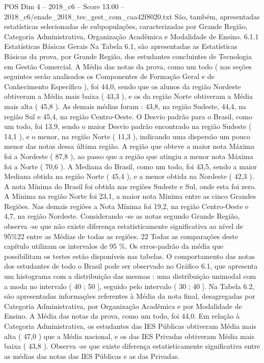 \begin{textsample}{POS Dim 4 – 2018\_c6 – Score 13.00 – 2018\_c6/enade\_2018\_tec\_gest\_com\_caa42f8020.txt}
São, também, apresentadas estatísticas selecionadas de subpopulações, caracterizadas por Grande Região, Categoria Administrativa, Organização Acadêmica e Modalidade de Ensino. 6.1.1 Estatísticas Básicas Gerais Na Tabela 6.1, são apresentadas as Estatísticas Básicas da prova, por Grande Região, dos estudantes concluintes de Tecnologia em Gestão Comercial.
A Média das notas da prova, como um todo ( nas seções seguintes serão analisados os Componentes de Formação Geral e de Conhecimento Específico ), foi 44,0, sendo que os alunos da região Nordeste obtiveram a Média mais baixa ( 43,3 ), e os da região Norte obtiveram a Média mais alta ( 45,8 ).
As demais médias foram : 43,8, na região Sudeste, 44,4, na região Sul e 45,4, na região Centro-Oeste.
O Desvio padrão para o Brasil, como um todo, foi 13,9, sendo o maior Desvio padrão encontrado na região Sudeste ( 14,1 ), e o menor, na região Norte ( 11,3 ), indicando uma dispersão um pouco menor das notas dessa última região.
A região que obteve a maior nota Máxima foi a Nordeste ( 87,8 ), ao passo que a região que atingiu a menor nota Máxima foi a Norte ( 70,6 ).
A Mediana do Brasil, como um todo, foi 43,5, sendo a maior Mediana obtida na região Norte ( 45,4 ), e a menor obtida na Nordeste ( 42,3 ).
A nota Mínima do Brasil foi obtida nas regiões Sudeste e Sul, onde esta foi zero.
A Mínima na região Norte foi 23,1, a maior nota Mínima entre as cinco Grandes Regiões.
Nas demais regiões a Nota Mínima foi 19,2, na região Centro-Oeste e 4,7, na região Nordeste.
Considerando -se as notas segundo Grande Região, observa -se que não existe diferença estatisticamente significativa ao nível de 95\%22 entre as Médias de todas as regiões. 22 Todas as comparações deste capítulo utilizam os intervalos de 95 \%.
Os erros-padrão da média que possibilitam os testes estão disponíveis nas tabelas.
O comportamento das notas dos estudantes de todo o Brasil pode ser observado no Gráfico 6.1, que apresenta um histograma com a distribuição das mesmas : uma distribuição unimodal com a moda no intervalo ( 40 ; 50 ], seguido pelo intervalo ( 30 ; 40 ].
Na Tabela 6.2, são apresentadas informações referentes à Média da nota final, desagregadas por Categoria Administrativa, por Organização Acadêmica e por Modalidade de Ensino.
A Média das notas da prova, como um todo, foi 44,0.
Em relação à Categoria Administrativa, os estudantes das IES Públicas obtiveram Média mais alta ( 47,0 ) que a Média nacional, e os das IES Privadas obtiveram Média mais baixa ( 43,8 ).
Observa -se que existe diferença estatisticamente significativa entre as médias das notas das IES Públicas e as das Privadas.

\end{textsample}
